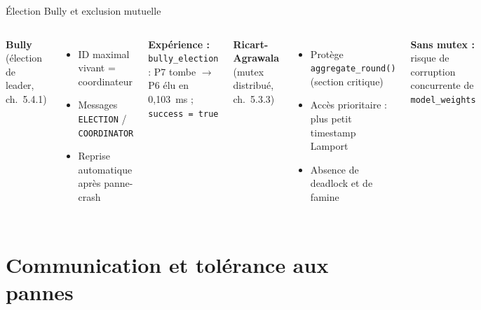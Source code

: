 \documentclass[11pt,french]{beamer}
\begin{document}
\begin{frame}{Élection Bully et exclusion mutuelle}
  \begin{columns}[T]
    \textbf{Bully} (élection de leader, ch.~5.4.1)
    \begin{itemize}\small
      \item ID maximal vivant = coordinateur
      \item Messages \texttt{ELECTION} / \texttt{COORDINATOR}
      \item Reprise automatique après panne-crash
    \end{itemize}

    \vspace{0.3cm}
    \textbf{Expérience :} \texttt{bully\_election} : P7 tombe $\rightarrow$ P6 élu en 0,103~ms ; \texttt{success = true}

    \textbf{Ricart-Agrawala} (mutex distribué, ch.~5.3.3)
    \begin{itemize}\small
      \item Protège \texttt{aggregate\_round()} (section critique)
      \item Accès prioritaire : plus petit timestamp Lamport
      \item Absence de deadlock et de famine
    \end{itemize}

    \vspace{0.3cm}
    \textbf{Sans mutex :} risque de corruption concurrente de \texttt{model\_weights}
  \end{columns}
\end{frame}

\section{Communication et tolérance aux pannes}
\end{document}
